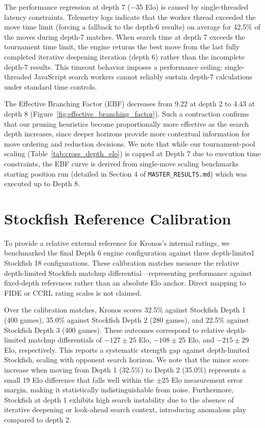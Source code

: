 The performance regression at depth 7 ($-$35 Elo) is caused by single-threaded latency constraints. Telemetry logs indicate that the worker thread exceeded the move time limit (forcing a fallback to the depth-6 results) on average for 42.5\% of the moves during depth-7 matches. When search time at depth 7 exceeds the tournament time limit, the engine returns the best move from the last fully completed iterative deepening iteration (depth 6) rather than the incomplete depth-7 results. This timeout behavior imposes a performance ceiling: single-threaded JavaScript search workers cannot reliably sustain depth-7 calculations under standard time controls.

The Effective Branching Factor (EBF) decreases from 9.22 at depth 2 to 4.43 at depth 8 (Figure~\ref{fig:effective_branching_factor}). Such a contraction confirms that our pruning heuristics become proportionally more effective as the search depth increases, since deeper horizons provide more contextual information for move ordering and reduction decisions. We note that while our tournament-pool scaling (Table~\ref{tab:cross_depth_elo}) is capped at Depth 7 due to execution time constraints, the EBF curve is derived from single-move scaling benchmarks starting position run (detailed in Section 4 of \texttt{MASTER\_RESULTS.md}) which was executed up to Depth 8.

\section{Stockfish Reference Calibration}
To provide a relative external reference for Kronos's internal ratings, we benchmarked the final Depth 6 engine configuration against three depth-limited Stockfish 18 configurations. These calibration matches measure the relative depth-limited Stockfish matchup differential---representing performance against fixed-depth references rather than an absolute Elo anchor. Direct mapping to FIDE or CCRL rating scales is not claimed.




Over the calibration matches, Kronos scores 32.5\% against Stockfish Depth 1 (400 games), 35.0\% against Stockfish Depth 2 (280 games), and 22.5\% against Stockfish Depth 3 (400 games). These outcomes correspond to relative depth-limited matchup differentials of $-127 \pm 25$ Elo, $-108 \pm 25$ Elo, and $-215 \pm 29$ Elo, respectively. This reports a systematic strength gap against depth-limited Stockfish, scaling with opponent search horizon. We note that the minor score increase when moving from Depth 1 (32.5\%) to Depth 2 (35.0\%) represents a small 19 Elo difference that falls well within the $\pm 25$ Elo measurement error margin, making it statistically indistinguishable from noise. Furthermore, Stockfish at depth 1 exhibits high search instability due to the absence of iterative deepening or look-ahead search context, introducing anomalous play compared to depth 2.

